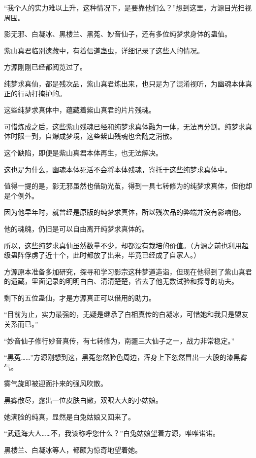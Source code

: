\begin{this_body}
“我个人的实力难以上升，这种情况下，是要靠他们么？”想到这里，方源目光扫视周围。

影无邪、白凝冰、黑楼兰、黑菟、妙音仙子，还有多位纯梦求身体的蛊仙。

紫山真君临别遗藏中，有着信道蛊虫，详细记录了这些人的情况。

方源刚刚已经都阅览过了。

纯梦求真仙，都是残次品，紫山真君炼出来，也只是为了混淆视听，为幽魂本体真正的行动打掩护的。

这些纯梦求真体中，蕴藏着紫山真君的片片残魂。

可惜炼成之后，这些紫山残魂已经和纯梦求真体融为一体，无法再分割。纯梦求真体时限一到，自爆成梦境，这些紫山残魂也会随之消散。

这个缺陷，即便是紫山真君本体再生，也无法解决。

这也是为什么，幽魂本体死活不会将本体残魂，寄托于这些纯梦求真体中。

值得一提的是，影无邪虽然也借助光茧，得到一具七转修为的纯梦求真体，但他却是个例外。

因为他早年时，就曾经是原版的纯梦求真体，所以残次品的弊端并没有影响他。

他的魂魄，仍旧是可以自由离开纯梦求真体的。

所以，这些纯梦求真仙虽然数量不少，却都没有栽培的价值。（方源之前也利用超级蛊阵俘虏了近十个，此时都放了出来，毕竟已经成了自家人。）

方源原本准备多加研究，探寻和学习影宗这种梦道造诣，但现在他得到了紫山真君的遗藏，里面记录的明明白白、清清楚楚，省去了他无数试验和探寻的功夫。

剩下的五位蛊仙，才是方源真正可以借用的助力。

“目前为止，实力最强的，无疑是继承了白相真传的白凝冰，可惜她和我只是盟友关系而已。”

“妙音仙子修行妙音真传，有七转修为，南疆三大仙子之一，战力非常稳定。”

“黑菟……”方源刚想到这，黑菟忽然脸色周边，浑身上下忽然冒出一大股的漆黑雾气。

雾气旋即被迎面扑来的强风吹散。

黑雾散尽，露出一位皮肤白嫩，双眼大大的小姑娘。

她满脸的纯真，显然是白兔姑娘又回来了。

“武遗海大人……不，我该称呼您什么？”白兔姑娘望着方源，唯唯诺诺。

黑楼兰、白凝冰等人，都颇为惊奇地望着她。


\end{this_body}
